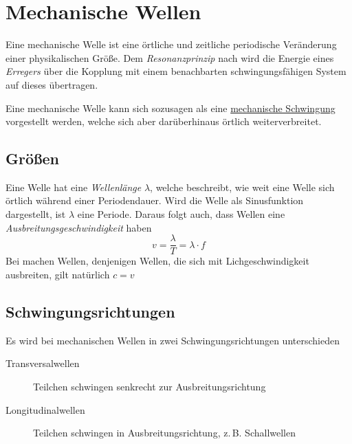 \documentclass{article}
\begin{document}
\section{Mechanische Wellen} 
Eine mechanische Welle ist eine örtliche und zeitliche periodische Veränderung einer physikalischen Größe. Dem \emph{Resonanzprinzip} nach wird die Energie eines \emph{Erregers} über die Kopplung mit einem benachbarten schwingungsfähigen System auf dieses übertragen.
 
Eine mechanische Welle kann sich sozusagen als eine \hyperref[Mechanische Schwingungen]{mechanische Schwingung} vorgestellt werden, welche sich aber darüberhinaus örtlich weiterverbreitet.
 
\subsection{Größen} 
Eine Welle hat eine \emph{Wellenlänge} $\lambda$, welche beschreibt, wie weit eine Welle sich örtlich während einer Periodendauer. Wird die Welle als Sinusfunktion dargestellt, ist $\lambda$ eine Periode. Daraus folgt auch, dass Wellen eine \emph{Ausbreitungsgeschwindigkeit} haben
\[
 v = \frac{\lambda}{T} = \lambda \cdot f 
\]
Bei machen Wellen, denjenigen Wellen, die sich mit Lichgeschwindigkeit ausbreiten, gilt natürlich $c=v$ 
 
\subsection{Schwingungsrichtungen} 
Es wird bei mechanischen Wellen in zwei Schwingungsrichtungen unterschieden
\begin{description}
 \item[Transversalwellen] Teilchen schwingen senkrecht zur Ausbreitungsrichtung
 \item[Longitudinalwellen] Teilchen schwingen in Ausbreitungsrichtung, z.\,B. Schallwellen
\end{description}
 
\end{document}
